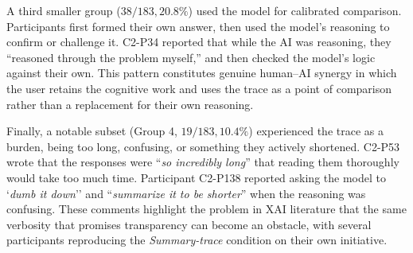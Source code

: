 \documentclass[acmlarge,review=true, anonymous=true]{acmart}
\newcommand{\daniela}[1]{\textcolor{colordaniela}{\textbf{\faComment~Daniela:} #1}}
\begin{document}


A third smaller group ($38/183, 20.8\%$) used the model for calibrated comparison. Participants first formed their own answer, then used the model's reasoning to confirm or challenge it. C2-P34 reported that while the AI was reasoning, they ``reasoned through the problem myself,'' and then checked the model’s logic against their own. %
This pattern constitutes genuine human–AI synergy \cite{} in which the user retains the cognitive work and uses the trace as a point of comparison rather than a replacement for their own reasoning.


Finally, a notable subset (Group 4, $19/183, 10.4\%$) experienced the trace as a burden, being too long, confusing, or something they actively shortened. C2-P53 wrote that the responses were ``\textit{so incredibly long}'' that reading them thoroughly would take too much time. Participant C2-P138 reported asking the model to `\textit{dumb it down}'' and ``\textit{summarize it to be shorter}'' when the reasoning was confusing. These comments highlight the problem in XAI literature that the same verbosity that promises transparency can become an obstacle, with several participants reproducing the \textit{Summary-trace} condition on their own initiative.

\end{document}
